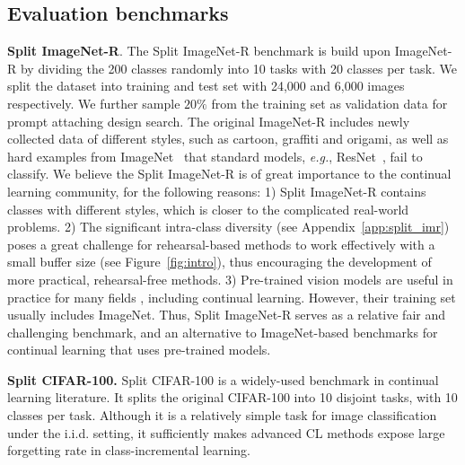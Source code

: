 \documentclass[runningheads]{llncs}
\newcommand{\eg}{\emph{e.g.}\xspace}
\begin{document}
\subsection{Evaluation benchmarks}
\textbf{Split ImageNet-R}. The Split ImageNet-R benchmark is build upon ImageNet-R \cite{hendrycks2020many} by dividing the 200 classes randomly into 10 tasks with 20 classes per task. We split the dataset into training and test set with 24,000 and 6,000 images respectively. We further sample $20\%$ from the training set as validation data for prompt attaching design search. The original ImageNet-R includes newly collected data of different styles, such as cartoon, graffiti and origami, as well as hard examples from ImageNet~\cite{deng2009imagenet} that standard models, \eg, ResNet~\cite{he2016deep}, fail to classify. We believe the Split ImageNet-R is of great importance to the continual learning community, for the following reasons: 1) Split ImageNet-R contains classes with different styles, which is closer to the complicated real-world problems. 2) The significant intra-class diversity (see Appendix~\ref{app:split_imr}) poses a great challenge for rehearsal-based methods to work effectively with a small buffer size (see Figure~\ref{fig:intro}), thus encouraging the development of more practical, rehearsal-free methods. 3) Pre-trained vision models are useful in practice for many fields \cite{ridnik2021imagenet,kolesnikov2020big}, including continual learning. However, their training set usually includes ImageNet. Thus, Split ImageNet-R serves as a relative fair and challenging benchmark, and an alternative to ImageNet-based benchmarks \cite{rebuffi2017icarl,wu2019large} for continual learning that uses pre-trained models.

\textbf{Split CIFAR-100.} Split CIFAR-100 is a widely-used benchmark in continual learning literature. It splits the original CIFAR-100 \cite{krizhevsky2009learning} into 10 disjoint tasks, with 10 classes per task. Although it is a relatively simple task for image classification under the i.i.d. setting, it sufficiently makes advanced CL methods expose large forgetting rate in class-incremental learning.

\end{document}
